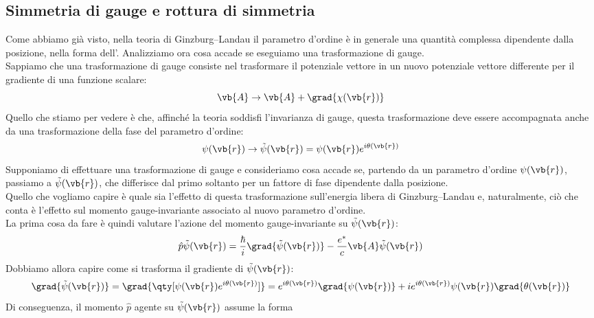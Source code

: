 \subsection{Simmetria di gauge e rottura di simmetria}
Come abbiamo già visto, nella teoria di Ginzburg--Landau il parametro d'ordine è in generale una quantità complessa dipendente dalla posizione, nella forma dell'. Analizziamo ora cosa accade se eseguiamo una trasformazione di gauge.\\
Sappiamo che una trasformazione di gauge consiste nel trasformare il potenziale vettore in un nuovo potenziale vettore differente per il gradiente di una funzione scalare:
\begin{equation*}
   \vb{A} \to \vb{A} + \grad{\chi(\vb{r})}
\end{equation*}
Quello che stiamo per vedere è che, affinché la teoria soddisfi l'invarianza di gauge, questa trasformazione deve essere accompagnata anche da una trasformazione della fase del parametro d'ordine:
\begin{equation*}
   \psi(\vb{r}) \to \tilde{\psi}(\vb{r}) = \psi(\vb{r})e^{i\theta(\vb{r})}
\end{equation*}
Supponiamo di effettuare una trasformazione di gauge e consideriamo cosa accade se, partendo da un parametro d'ordine $\psi(\vb{r})$, passiamo a $\tilde{\psi}(\vb{r})$, che differisce dal primo soltanto per un fattore di fase dipendente dalla posizione.\\
Quello che vogliamo capire è quale sia l'effetto di questa trasformazione sull'energia libera di Ginzburg--Landau e, naturalmente, ciò che conta è l'effetto sul momento gauge-invariante associato al nuovo parametro d'ordine.\\
La prima cosa da fare è quindi valutare l'azione del momento gauge-invariante su $\tilde{\psi}(\vb{r})$:
\begin{equation*}
   \hat{p}\tilde{\psi}(\vb{r})
   =
   \frac{\hbar}{i}\grad{\tilde{\psi}(\vb{r})}
   -
   \frac{e^*}{c}\vb{A}\tilde{\psi}(\vb{r})
\end{equation*}
Dobbiamo allora capire come si trasforma il gradiente di $\tilde{\psi}(\vb{r})$:
\begin{equation*}
   \grad{\tilde{\psi}(\vb{r})}
   =
   \grad{
      \qty[
         \psi(\vb{r})e^{i\theta(\vb{r})}
      ]
   }
   =
   e^{i\theta(\vb{r})}\grad{\psi(\vb{r})}
   +
   ie^{i\theta(\vb{r})}\psi(\vb{r})\grad{\theta(\vb{r})}
\end{equation*}
Di conseguenza, il momento $\hat{p}$ agente su $\tilde{\psi}(\vb{r})$ assume la forma
